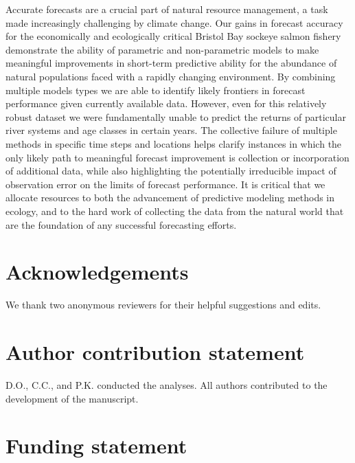 \documentclass[
]{article}
\begin{document}
Accurate forecasts are a crucial part of natural resource management, a task made increasingly challenging by climate change. Our gains in forecast accuracy for the economically and ecologically critical Bristol Bay sockeye salmon fishery demonstrate the ability of parametric and non-parametric models to make meaningful improvements in short-term predictive ability for the abundance of natural populations faced with a rapidly changing environment. By combining multiple models types we are able to identify likely frontiers in forecast performance given currently available data. However, even for this relatively robust dataset we were fundamentally unable to predict the returns of particular river systems and age classes in certain years. The collective failure of multiple methods in specific time steps and locations helps clarify instances in which the only likely path to meaningful forecast improvement is collection or incorporation of additional data, while also highlighting the potentially irreducible impact of observation error on the limits of forecast performance. It is critical that we allocate resources to both the advancement of predictive modeling methods in ecology, and to the hard work of collecting the data from the natural world that are the foundation of any successful forecasting efforts.

\hypertarget{acknowledgements}{%
\section{Acknowledgements}\label{acknowledgements}}

We thank two anonymous reviewers for their helpful suggestions and edits.

\hypertarget{author-contribution-statement}{%
\section*{Author contribution statement}\label{author-contribution-statement}}

D.O., C.C., and P.K. conducted the analyses. All authors contributed to the development of the manuscript.

\hypertarget{funding-statement}{%
\section*{Funding statement}\label{funding-statement}}
\end{document}
